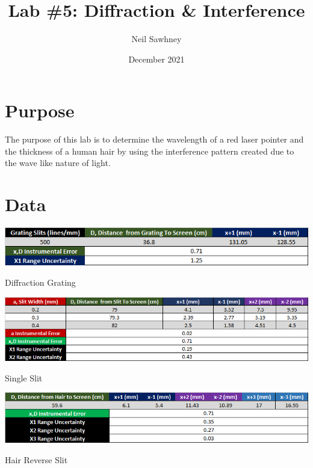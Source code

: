 \documentclass{report}
\title{Lab \#5: Diffraction \& Interference}
\author{Neil Sawhney}
\date{December 2021}
\begin{document}


\maketitle
\tableofcontents

\chapter{Purpose}
The purpose of this lab is to determine the wavelength of a red laser pointer and the thickness of a human hair by using the interference pattern created due to the wave like nature of light.



\chapter{Data}

\begin{table}[H]
    \centering
    \includegraphics[width = \textwidth]{partATable.png}
    \caption{Diffraction Grating}
    \label{partATable}
\end{table}
\bigskip


\begin{table}[H]
    \centering
    \includegraphics[width = \textwidth]{partBTable.png}
    \caption{Single Slit}
    \label{partBTable}
\end{table}
\bigskip


\begin{table}[H]
    \centering
    \includegraphics[width = \textwidth]{partCTable.png}
    \caption{Hair Reverse Slit}
    \label{partCTable}
\end{table}
\bigskip
\end{document}
